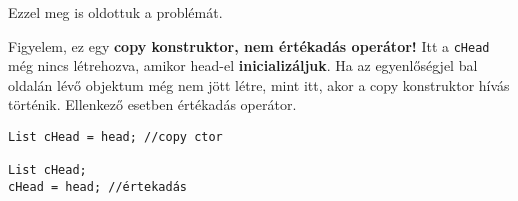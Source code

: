 \documentclass[../cpp_book/cpp_book.tex]{subfiles}
\begin{document}
	\medskip
	Ezzel meg is oldottuk a problémát. 
	
	Figyelem, ez egy \textbf{copy konstruktor, nem értékadás operátor!} Itt a \texttt{cHead} még nincs létrehozva, amikor head-el \textbf{inicializáljuk}. Ha az egyenlőségjel bal oldalán lévő objektum még nem jött létre, mint itt, akor a copy konstruktor hívás történik. Ellenkező esetben értékadás operátor.
	\begin{lstlisting}
List cHead = head; //copy ctor

List cHead;
cHead = head; //értekadás
	\end{lstlisting}
	
\end{document}
